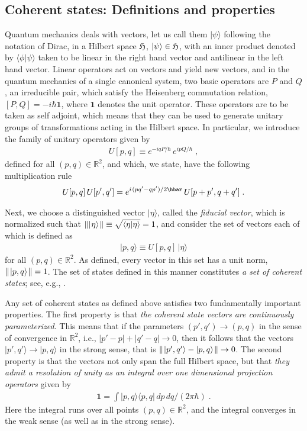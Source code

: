 \documentclass[12pt]{article}
\def\one{\mathbf 1}
\def\ra{\rightarrow}
\def\s{\hskip.08em}
\def\bn{\begin{eqnarray}}     %
\def\en{\end{eqnarray}}       %
\def\<{\langle}
\def\>{\rangle}
\begin{document}
\subsection{Coherent states: Definitions and properties}
Quantum mechanics deals with vectors, let us call them $|\psi\>$ following 
the notation of Dirac, in a Hilbert space $\frak H$, $|\psi\>\in{\frak H}$, 
with an inner product denoted by $\<\phi|\psi\>$ taken to be linear in the 
right hand vector and antilinear in the left hand vector. Linear operators 
act on vectors and yield new vectors, and in the quantum mechanics of a 
single canonical system, two basic operators are $P$ and $Q$, an 
irreducible pair,  which satisfy the Heisenberg commutation relation, 
$[P,Q]=-i\hbar\one$, where $\one$ denotes the unit operator. These 
operators are to be taken as self adjoint, which means that they can be 
used to generate unitary groups of transformations acting in the Hilbert 
space. In particular, we introduce the family of unitary operators given by
   \bn  U[p,q]\equiv e^{-iqP/\hbar}\,e^{ipQ/\hbar}\;,  \en
defined for all $(p,q)\in{\mathbb R}^2$, and which, we state, have the 
following multiplication rule
   \bn  U[p,q]\,U[p',q']=e^{i\s(pq'-qp')/2\hbar}\,U[p+p',q+q'] \;. \en

Next, we choose a distinguished vector $|\eta\>$, called the {\it fiducial 
vector}, 
which is normalized such that $\||\s\eta\>\s\|\equiv\sqrt{\<\eta|\eta\>}=1$, 
and consider the set of vectors each of which is defined as
  \bn  |p,q\>\equiv U[p,q]\,|\eta\>  \en
for all $(p,q)\in{\mathbb R}^2$. As defined, every vector in this set has 
a unit norm, $\|\s|p,q\>\s\|=1$. The set of states defined in this manner 
constitutes {\it a set of coherent states}; see, e.g., \cite{klabs}. 

Any set of coherent states as defined above satisfies two fundamentally 
important properties. The first property is that {\it the coherent state 
vectors are continuously parameterized}. This means that if the parameters 
$(p',q')\ra(p,q)$ in the sense of convergence in ${\mathbb R}^2$, i.e., 
$|p'-p|+|q'-q|\ra0$, then it follows that the vectors $|p',q'\>\ra|p,q\>$ 
in the strong sense, that is $\|\s|p',q'\>-|p,q\>\s\|\ra0$. The second 
property is that the vectors not only span the full Hilbert space, but 
that {\it they admit a resolution of unity as an integral over one 
dimensional projection operators} given by
  \bn  \one=\int|p,q\>\<p,q|\,dp\, dq/(2\pi\hbar)\;. \en
Here the integral runs over all points $(p,q)\in{\mathbb R}^2$, and the 
integral converges in the weak sense (as well as in the strong sense).
\end{document}
